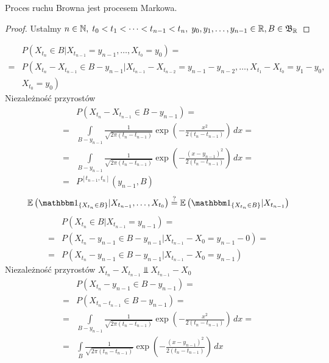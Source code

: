 \begin{twr}
Proces ruchu Browna jest procesem Markowa.
\begin{proof}
Ustalmy $ n\in \mathbb N, \;t_0<t_1<\dots<t_{n-1}<t_n,\;y_0,y_1,\dots,y_{n-1}\in \mathbb R ,\\ B\in \mathfrak B_\mathbb R  $
\end{proof}
\begin{align*}
&P\left(X_{t_n}\in B|X_{t_{n-1}}=y_{n-1},\dots,X_{t_0}=y_0\right)
=\\=&
P\left(X_{t_n}-X_{t_{n-1}}\in B-y_{n-1}|X_{t_{n-1}}-X_{t_{n-2}}=y_{n-1}-y_{n-2},\dots,X_{t_1}-X_{t_0}=y_1-y_0,\right .\\&\left .X_{t_0}=y_0\right)
\end{align*}
Niezależność przyrostów
\begin{align*}
&P\left(X_{t_{n}}-X_{t_{n-1}}\in B-y_{n-1}\right)
=\\=&
\int\limits_{B-y_{n-1}}\frac{1}{\sqrt{2\pi(t_n-t_{n-1})}}\exp\left(-\frac{x^2}{2\left(t_n-t_{n-1}\right)}\right)\,dx
=\\=&
\int\limits_{B-y_{n-1}}\frac{1}{\sqrt{2\pi(t_n-t_{n-1})}}\exp\left(-\frac{\left(x-y_{n-1}\right)^2}{2\left(t_n-t_{n-1}\right)}\right)\,dx
=\\=&
P^{[t_{n-1},t_n]}\left(y_{n-1},B\right)
\end{align*}
\begin{gather*}
\mathbb E 
\left(\mathbbm1_{\left\{X_{t_n}\in B\right\}}|X_{t_{n-1}},\dots,X_{t_0}\right)
\stackrel{?}{=}
\mathbb E 
\left(\mathbbm1_{\left\{X_{t_n}\in B\right\}}|X_{t_{n-1}}\right)
\end{gather*}
\begin{align*}
&
P\left(X_{t_n}\in B|X_{t_{n-1}}=y_{n-1}\right)
=\\=&
P\left(X_{t_n}-y_{n-1}\in B-y_{n-1}|X_{t_{n-1}}-X_0=y_{n-1}-0\right)
=\\=&
P\left(X_{t_n}-y_{n-1}\in B-y_{n-1}|X_{t_{n-1}}-X_0=y_{n-1}\right)
\end{align*}
Niezależność przyrostów $ X_{t_n}-X_{t_{n-1}}\Perp X_{t_{n-1}}-X_0 $
\begin{align*}
&
P\left(X_{t_n}-y_{n-1}\in B-y_{n-1}\right)
=\\=&
P\left(X_{t_n-t_{n-1}}\in B-y_{n-1}\right)
=\\=&
\int\limits_{B-y_{n-1}}\frac{1}{\sqrt{2\pi(t_n-t_{n-1})}}\exp\left(-\frac{x^2}{2\left(t_n-t_{n-1}\right)}\right)\,dx
=\\=&
\int\limits_{B}\frac{1}{\sqrt{2\pi(t_n-t_{n-1})}}\exp\left(-\frac{\left(x-y_{n-1}\right)^2}{2\left(t_n-t_{n-1}\right)}\right)\,dx
\end{align*}
\end{twr}
